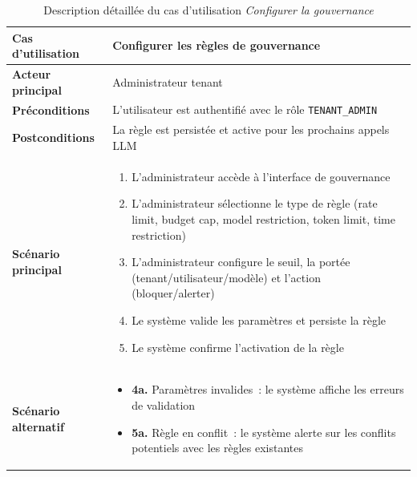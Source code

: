 \begin{table}[H]
\centering
\caption{Description détaillée du cas d'utilisation \textit{Configurer la gouvernance}}
\label{tab:uc_desc_governance}
\begin{tabularx}{\textwidth}{|l|X|}
\hline
\textbf{Cas d'utilisation} & Configurer les règles de gouvernance \\
\hline
\textbf{Acteur principal} & Administrateur tenant \\
\hline
\textbf{Préconditions} & L'utilisateur est authentifié avec le rôle \texttt{TENANT\_ADMIN} \\
\hline
\textbf{Postconditions} & La règle est persistée et active pour les prochains appels LLM \\
\hline
\textbf{Scénario principal} & \begin{minipage}[t]{\linewidth}\vspace{2pt}
\begin{enumerate}[noitemsep,topsep=0pt]
\item L'administrateur accède à l'interface de gouvernance
\item L'administrateur sélectionne le type de règle (rate limit, budget cap, model restriction, token limit, time restriction)
\item L'administrateur configure le seuil, la portée (tenant/utilisateur/modèle) et l'action (bloquer/alerter)
\item Le système valide les paramètres et persiste la règle
\item Le système confirme l'activation de la règle
\end{enumerate}\vspace{2pt}
\end{minipage} \\
\hline
\textbf{Scénario alternatif} & \begin{minipage}[t]{\linewidth}\vspace{2pt}
\begin{itemize}[noitemsep,topsep=0pt]
\item \textbf{4a.} Paramètres invalides~: le système affiche les erreurs de validation
\item \textbf{5a.} Règle en conflit~: le système alerte sur les conflits potentiels avec les règles existantes
\end{itemize}\vspace{2pt}
\end{minipage} \\
\hline
\end{tabularx}
\end{table}


